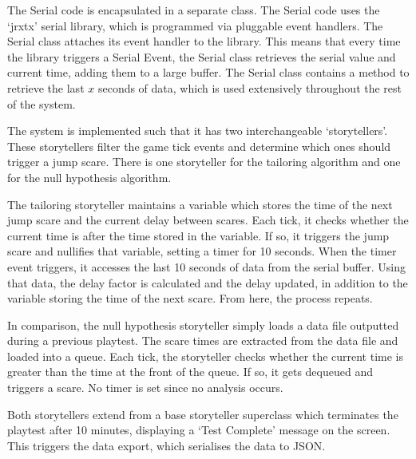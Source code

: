\documentclass[12pt,a4paper]{article}\usepackage[]{graphicx}\usepackage[]{color}
\begin{document}
The Serial code is encapsulated in a separate class.
The Serial code uses the `jrxtx' serial library, which is programmed via pluggable event handlers.
The Serial class attaches its event handler to the library.
This means that every time the library triggers a Serial Event, the Serial class retrieves the serial value and current time, adding them to a large buffer.
The Serial class contains a method to retrieve the last $x$ seconds of data, which is used extensively throughout the rest of the system.

The system is implemented such that it has two interchangeable `storytellers'.
These storytellers filter the game tick events and determine which ones should trigger a jump scare.
There is one storyteller for the tailoring algorithm and one for the null hypothesis algorithm.

The tailoring storyteller maintains a variable which stores the time of the next jump scare and the current delay between scares.
Each tick, it checks whether the current time is after the time stored in the variable.
If so, it triggers the jump scare and nullifies that variable, setting a timer for 10 seconds.
When the timer event triggers, it accesses the last 10 seconds of data from the serial buffer.
Using that data, the delay factor is calculated and the delay updated, in addition to the variable storing the time of the next scare.
From here, the process repeats.

In comparison, the null hypothesis storyteller simply loads a data file outputted during a previous playtest.
The scare times are extracted from the data file and loaded into a queue.
Each tick, the storyteller checks whether the current time is greater than the time at the front of the queue.
If so, it gets dequeued and triggers a scare.
No timer is set since no analysis occurs.

Both storytellers extend from a base storyteller superclass which terminates the playtest after 10 minutes, displaying a `Test Complete' message on the screen.
This triggers the data export, which serialises the data to JSON.
\end{document}
